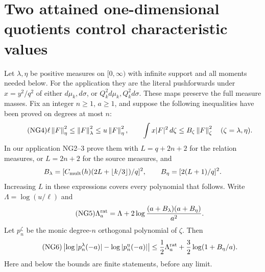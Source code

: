 \section{Two attained one-dimensional quotients control characteristic values}
Let $\lambda,\eta$ be positive measures on $[0,\infty)$ with infinite
support and all moments needed below. For the application they are the
literal pushforwards under $x=y^2/q^2$ of either $d\mu_k,d\sigma$, or
$Q_k^2d\mu_k,Q_k^2d\sigma$. These maps preserve the full measure masses.
Fix an integer $n\ge1$, $a\ge1$, and suppose the following inequalities
have been proved on degrees at most $n$:
\begin{equation}\tag{NG4}
 \ell\left\lVert F\right\rVert_\eta^2\le\left\lVert F\right\rVert_\lambda^2\le u\left\lVert F\right\rVert_\eta^2,
 \qquad \int x|F|^2\,d\zeta\le B_\zeta\left\lVert F\right\rVert_\zeta^2
 \quad(\zeta=\lambda,\eta).
\end{equation}
In our application NG2--3 prove them with
$L=q+2n+2$ for the relation measures, or $L=2n+2$ for the source measures,
and
\[
 B_\lambda=[C_{\rm mult}(h)(2L+\lfloor k/3\rfloor)/q]^2,
 \qquad B_\eta=[2(L+1)/q]^2.
\]
Increasing $L$ in these expressions covers every polynomial that follows.
Write $\Lambda=\log(u/\ell)$ and
\begin{equation}\tag{NG5}
 \Lambda_a^{\rm rat}=\Lambda+
       2\log\frac{(a+B_\lambda)(a+B_\eta)}{a^2}.
\end{equation}
Let $p_n^\zeta$ be the monic degree-$n$ orthogonal polynomial of $\zeta$.
Then
\begin{equation}\tag{NG6}
 \left|\log|p_n^\lambda(-a)|-\log|p_n^\eta(-a)|\right|
 \le\frac12\Lambda_a^{\rm rat}
                   +\frac32\log(1+B_\eta/a).
\end{equation}
Here and below the bounds are finite statements, before any limit.

